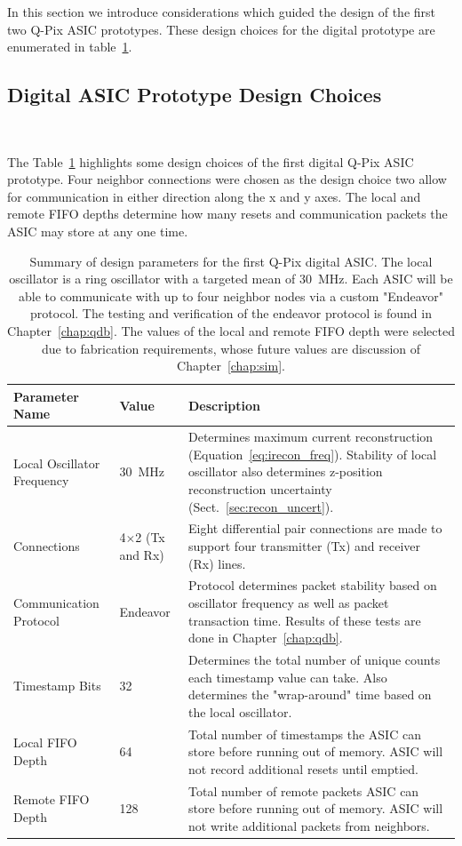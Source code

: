 In this section we introduce considerations which guided the design of the first two Q-Pix ASIC prototypes.
These design choices for the digital prototype are enumerated in table~\ref{table:digital_design_params}.

\subsection{Digital ASIC Prototype Design Choices}~\label{sec:design_choices}

The Table~\ref{table:digital_design_params} highlights some design choices of the first digital Q-Pix ASIC prototype.
Four neighbor connections were chosen as the design choice two allow for communication in either direction along the x and y axes.
The local and remote FIFO depths determine how many resets and communication packets the ASIC may store at any one time.

\begin{table}
\begin{center}
\begin{tabular}{||p{30mm} | p{30mm} | p{90mm}||}
 \hline
 Parameter Name & Value & Description \\ 
 \hline\hline
Local Oscillator Frequency & 30~\unit{MHz} & Determines maximum current reconstruction (Equation~\ref{eq:irecon_freq}). Stability of local oscillator also determines z-position reconstruction uncertainty (Sect.~\ref{sec:recon_uncert}). \\
 \hline
Connections & 4$\times$2 (Tx and Rx) &  Eight differential pair connections are made to support four transmitter (Tx) and receiver (Rx) lines. \\
 \hline
Communication Protocol & Endeavor & Protocol determines packet stability based on oscillator frequency as well as packet transaction time. Results of these tests are done in Chapter~\ref{chap:qdb}. \\
 \hline
Timestamp Bits & 32 & Determines the total number of unique counts each timestamp value can take. Also determines the "wrap-around" time based on the local oscillator.  \\
 \hline
Local FIFO Depth & 64 & Total number of timestamps the ASIC can store before running out of memory. ASIC will not record additional resets until emptied. \\
 \hline
Remote FIFO Depth & 128 & Total number of remote packets ASIC can store before running out of memory. ASIC will not write additional packets from neighbors. \\
 \hline
 \hline
\end{tabular}
\caption{Summary of design parameters for the first Q-Pix digital ASIC.
The local oscillator is a ring oscillator with a targeted mean of 30~\unit{MHz}.
Each ASIC will be able to communicate with up to four neighbor nodes via a custom "Endeavor" protocol.
The testing and verification of the endeavor protocol is found in Chapter~\ref{chap:qdb}.
The values of the local and remote FIFO depth were selected due to fabrication requirements, whose future values are discussion of Chapter~\ref{chap:sim}.
}
\label{table:digital_design_params}
\end{center}
\end{table}

